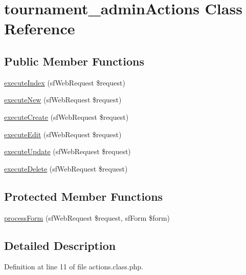 \hypertarget{classtournament__admin_actions}{\section{tournament\-\_\-admin\-Actions Class Reference}
\label{classtournament__admin_actions}
}
\subsection*{Public Member Functions}
\begin{DoxyCompactItemize}
\item 
\hyperlink{classtournament__admin_actions_a948cc911eb1d9f77990be54af3b2080f}{execute\-Index} (sf\-Web\-Request \$request)
\item 
\hyperlink{classtournament__admin_actions_a0ffbea56560c6c633dae68ec22aff21c}{execute\-New} (sf\-Web\-Request \$request)
\item 
\hyperlink{classtournament__admin_actions_a75837617743fb64dca82d8133b2c662a}{execute\-Create} (sf\-Web\-Request \$request)
\item 
\hyperlink{classtournament__admin_actions_af4d8fedd4b28f3398826a1bb8fa54394}{execute\-Edit} (sf\-Web\-Request \$request)
\item 
\hyperlink{classtournament__admin_actions_af7b4f51862add3c2ebb54efc136a0840}{execute\-Update} (sf\-Web\-Request \$request)
\item 
\hyperlink{classtournament__admin_actions_a52b5b11b11a0070dd2662257520c045a}{execute\-Delete} (sf\-Web\-Request \$request)
\end{DoxyCompactItemize}
\subsection*{Protected Member Functions}
\begin{DoxyCompactItemize}
\item 
\hyperlink{classtournament__admin_actions_a7cf661d837626e0320753cbffa019a01}{process\-Form} (sf\-Web\-Request \$request, sf\-Form \$form)
\end{DoxyCompactItemize}


\subsection{Detailed Description}


Definition at line 11 of file actions.\-class.\-php.



